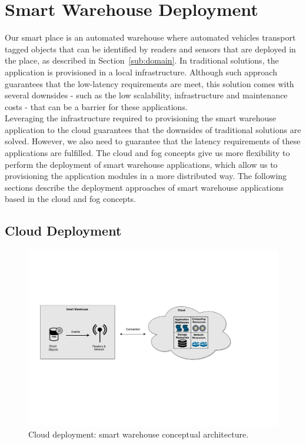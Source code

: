 \section{Smart Warehouse Deployment}
\label{sec:sol_smart_warehouse_deployment}
Our smart place is an automated warehouse where automated vehicles transport tagged objects that can
be identified by readers and sensors that are deployed in the place, as described in Section~\ref{sub:domain}.
In traditional solutions, the application is provisioned in a local infrastructure. Although such
approach guarantees that the low-latency requirements are meet, this solution comes with several
downsides - such as the low scalability, infrastructure and maintenance costs - that can be a barrier
for these applications.\\

Leveraging the infrastructure required to provisioning the smart warehouse application to the cloud
guarantees that the downsides of traditional solutions are solved. However, we also need to
guarantee that the latency requirements of these applications are fulfilled. The cloud and fog concepts
give us more flexibility to perform the deployment of smart warehouse applications, which allow us to
provisioning the application modules in a more distributed way. The following sections describe
the deployment approaches of smart warehouse applications based in the cloud and fog concepts.

\subsection{Cloud Deployment}
\label{sub:sol_cloud}

\begin{figure}[ht!]
\centering
\includegraphics[width=\textwidth]{./images/solution_cloud_architecture}
\caption[Cloud deployment: conceptual architecture.]{Cloud deployment: smart warehouse conceptual architecture.}
\label{fig:solution_cloud_architecture}
\end{figure}

